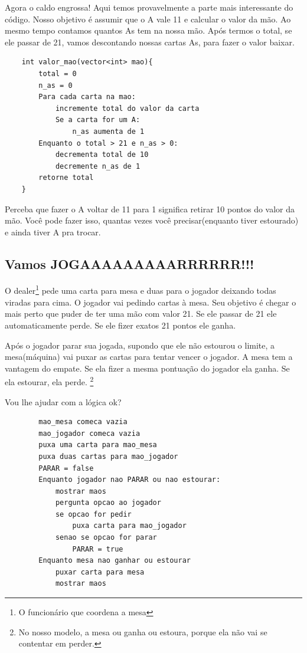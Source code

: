 \documentclass[12pt]{article}
\newcommand{\note}[1]{\footnote{#1}} %
\begin{document}
Agora o caldo engrossa! Aqui temos provavelmente a parte mais interessante do
código. Nosso objetivo é assumir que o A vale 11 e calcular o valor da mão. Ao
mesmo tempo contamos quantos As tem na nossa mão. Após termos o total, se ele
passar de 21, vamos descontando nossas cartas As, para fazer o valor baixar.

\begin{mdframed}[nobreak=true]
	\begin{lstlisting}
	int valor_mao(vector<int> mao){
		total = 0
		n_as = 0
		Para cada carta na mao:
			incremente total do valor da carta
			Se a carta for um A:
				n_as aumenta de 1
		Enquanto o total > 21 e n_as > 0:
			decrementa total de 10
			decremente n_as de 1
		retorne total
	}
	\end{lstlisting}
\end{mdframed}

Perceba que fazer o A voltar de 11 para 1 significa retirar 10 pontos do valor
da mão. Você pode fazer isso, quantas vezes você precisar(enquanto tiver
estourado) e ainda tiver A pra trocar.

\subsection{Vamos JOGAAAAAAAAARRRRRR!!!}

O dealer\note{O funcionário que coordena a mesa} pede uma carta
para mesa e duas para o jogador deixando todas viradas para cima. O jogador vai
pedindo cartas à mesa. Seu objetivo é chegar o mais perto que puder de ter uma
mão com valor 21. Se ele passar de 21 ele automaticamente perde. Se ele fizer
exatos 21 pontos ele ganha. 

Após o jogador parar sua jogada, supondo que ele não estourou o limite, a
mesa(máquina) vai puxar as cartas para tentar vencer o jogador. A mesa tem a
vantagem do empate. Se ela fizer a mesma pontuação do jogador ela ganha. Se ela
estourar, ela perde. \note{No nosso modelo, a mesa ou ganha ou estoura, porque
ela não vai se contentar em perder.}

Vou lhe ajudar com a lógica ok?

\begin{mdframed}[nobreak=true]
	\begin{lstlisting}
		mao_mesa comeca vazia
		mao_jogador comeca vazia
		puxa uma carta para mao_mesa
		puxa duas cartas para mao_jogador
		PARAR = false
		Enquanto jogador nao PARAR ou nao estourar:
			mostrar maos
			pergunta opcao ao jogador
			se opcao for pedir
				puxa carta para mao_jogador
			senao se opcao for parar
				PARAR = true
		Enquanto mesa nao ganhar ou estourar
			puxar carta para mesa
			mostrar maos

	\end{lstlisting}
\end{mdframed}
\end{document}
